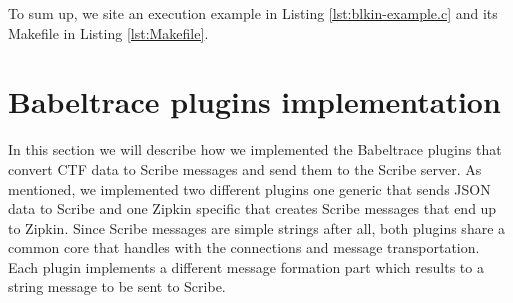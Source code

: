 To sum up, we site an execution example in Listing \ref{lst:blkin-example.c} and
its Makefile in Listing \ref{lst:Makefile}.


\section{Babeltrace plugins implementation}

In this section we will describe how we implemented the Babeltrace plugins that
convert CTF data to Scribe messages and send them to the Scribe server. As
mentioned, we implemented two different plugins one generic that sends JSON data
to Scribe and one Zipkin specific that creates Scribe messages that end up to
Zipkin. Since Scribe messages are simple strings after all, both plugins share a
common core that handles with the connections and message transportation. Each
plugin implements a different message formation part which results to a string
message to be sent to Scribe.
